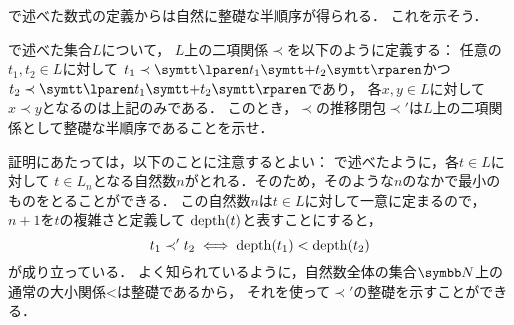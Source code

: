 
\begin{Que} \label{Que:well-foundedexample}
	で述べた数式の定義からは自然に整礎な半順序が得られる．
	これを示そう．

	で述べた集合\(L\)について，
	\(L\)上の二項関係\(\prec\)を以下のように定義する：
	任意の\(t_1, t_2 \in L\)に対して
	\(t_1 \prec \obj{\lparen} t_1 \obj{+} t_2 \obj{\rparen}\)かつ
	\(t_2 \prec \obj{\lparen} t_1 \obj{+} t_2 \obj{\rparen}\)であり，
	各\(x, y \in L\)に対して\(x \prec y\)となるのは上記のみである．
	このとき，\(\prec\)の推移閉包\(\prec'\)は\(L\)上の二項関係として整礎な半順序であることを示せ．

	証明にあたっては，以下のことに注意するとよい：
	で述べたように，各\(t \in L\)に対して
	\(t \in L_{n}\)となる自然数\(n\)がとれる．そのため，そのような\(n\)のなかで最小のものをとることができる．
	この自然数\(n\)は\(t \in L\)に対して一意に定まるので，\(n + 1\)を\(t\)の複雑さと定義して
	\(\apply{\depth}{t}\)と表すことにすると，
	\begin{equation}
		t_1 \prec' t_2 \metaequivalent \apply{\depth}{t_1} < \apply{\depth}{t_2}
		\label{eq:recursivedefinitiondepthorder}
	\end{equation}
	が成り立っている．
	よく知られているように，自然数全体の集合\(\Natural\)上の通常の大小関係\(\mathord{<}\)は整礎であるから，
	それを使って\(\prec'\)の整礎を示すことができる．
\end{Que}

